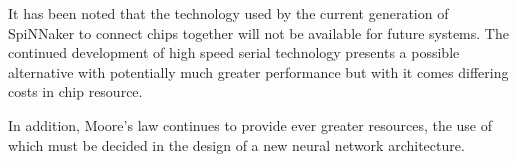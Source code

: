 	
	It has been noted that the technology used by the current generation of
	SpiNNaker to connect chips together will not be available for future systems.
	The continued development of high speed serial technology presents a possible
	alternative with potentially much greater performance but with it comes
	differing costs in chip resource.
	
	In addition, Moore's law continues to provide ever greater resources, the use
	of which must be decided in the design of a new neural network architecture.
	
